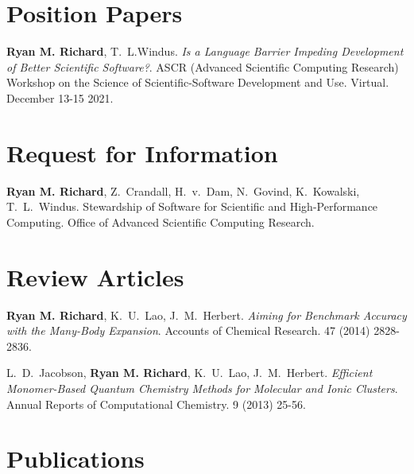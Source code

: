 \documentclass[11pt,a4paper,sans]{moderncv}
\begin{document}
\section{Position Papers}
\begin{etaremune}
	\item{\textbf{Ryan M. Richard}, T.~L.Windus. \emph{Is a Language Barrier
	Impeding Development of Better Scientific Software?}. ASCR (Advanced
	Scientific Computing Research) Workshop on the Science of
	Scientific-Software Development and Use. Virtual. December 13-15 2021.}
\end{etaremune}

\section{Request for Information}
\begin{etaremune}
	\item{\textbf{Ryan M. Richard}, Z.~Crandall, H.~v.~Dam, N.~Govind,
	K.~Kowalski, T.~L.~Windus. Stewardship of Software for Scientific and
	High-Performance Computing. Office of Advanced Scientific Computing
	Research.
	}
\end{etaremune}

\section{Review Articles}
\vspace{5pt}
\begin{etaremune}
	\item{\textbf{Ryan M. Richard}, K.~U.~Lao, J.~M.~Herbert.  {\em Aiming for 
	      Benchmark Accuracy with the Many-Body Expansion}.  Accounts of 
		  Chemical Research.  47 (2014) 2828-2836.}
	\item{L.~D.~Jacobson, \textbf{Ryan M. Richard}, K.~U.~Lao, J.~M.~Herbert.  
	      {\em Efficient Monomer-Based Quantum Chemistry Methods for Molecular 
		  and Ionic Clusters}.  Annual Reports of Computational Chemistry.  
		  9 (2013) 25-56.}
\end{etaremune}

\section{Publications}
\end{document}
